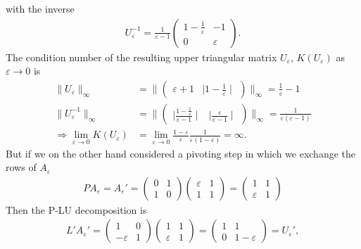 with the inverse
\begin{align}
    U_\varepsilon^{-1}= \frac{1}{\varepsilon -1}
    \begin{pmatrix}1-\frac{1}{\varepsilon} & -1 \\ 0  & \varepsilon
    \end{pmatrix} .
\end{align}
The condition number of the resulting upper triangular matrix
$U_\varepsilon$, $K(U_\varepsilon)$  as $\varepsilon \rightarrow 0$ is
\begin{align}
    \|U_\varepsilon\|_\infty &= \|\begin{pmatrix} \varepsilon + 1 &
     \mid 1-\frac{1}{\varepsilon} \mid \end{pmatrix} \|_\infty = \frac{1}{\varepsilon} -
    1\\
    \|U_\varepsilon^{-1}\|_\infty &=
    \|\begin{pmatrix}  \mid \frac{1- \frac{1}{\varepsilon}}{\varepsilon
    -1} \mid &  \mid\frac{\varepsilon}{\varepsilon-1} \mid \end{pmatrix}
    \|_\infty = \frac{1}{\varepsilon(\varepsilon - 1)}\\
    \Longrightarrow
    \lim_{\varepsilon \to 0}K(U_\varepsilon) &= \lim_{\varepsilon \to 0}
    \frac{1-\varepsilon}{\varepsilon}\frac{1}{\varepsilon(1 -
    \varepsilon)} = \infty.
\end{align}
But if we on the other hand considered a pivoting step in which we exchange
the rows of $A_\varepsilon$
\begin{align}
    PA_\varepsilon = A_\varepsilon' =
    \begin{pmatrix} 0 & 1\\ 1 & 0 \end{pmatrix}
    \begin{pmatrix} \varepsilon & 1 \\ 1 & 1 \end{pmatrix}
    =
    \begin{pmatrix}1 & 1 \\ \varepsilon & 1 \end{pmatrix}
\end{align}
Then the P-LU decomposition is
\begin{align}
    L'A_\varepsilon' =
    \begin{pmatrix} 1 & 0 \\ -\varepsilon & 1 \end{pmatrix}
    \begin{pmatrix}1 & 1 \\ \varepsilon & 1 \end{pmatrix}
    =
    \begin{pmatrix}1 & 1 \\ 0 & 1 - \varepsilon \end{pmatrix} =
    U_\varepsilon',
\end{align}
